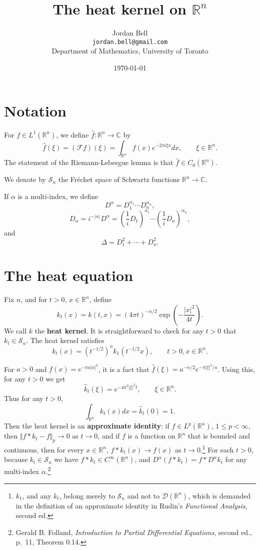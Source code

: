 \documentclass{article}
\newcommand{\norm}[1]{\Vert #1 \Vert}
\begin{document}
\title{The heat kernel on $\mathbb{R}^n$}
\author{Jordan Bell\\ \texttt{jordan.bell@gmail.com}\\Department of Mathematics, University of Toronto}
\date{\today}


\maketitle

\section{Notation}
For $f \in L^1(\mathbb{R}^n)$, we define $\hat{f}:\mathbb{R}^n \to \mathbb{C}$ by 
\[
\hat{f}(\xi) =(\mathscr{F}f)(\xi)= \int_{\mathbb{R}^n} f(x) e^{-2\pi i \xi x} dx, \qquad \xi \in \mathbb{R}^n.
\]
The statement of the Riemann-Lebesgue lemma is that $\hat{f} \in C_0(\mathbb{R}^n)$. 

We denote by $\mathscr{S}_n$ the Fr\'echet space of Schwartz functions $\mathbb{R}^n \to \mathbb{C}$.

If $\alpha$ is a multi-index, we define
\[
D^\alpha = D_1^{\alpha_1} \cdots D_n^{\alpha_n},
\]
\[
D_\alpha = i^{-|\alpha|} D^\alpha = \left(\frac{1}{i} D_1\right)^{\alpha_1} \cdots \left( \frac{1}{i} D_n\right)^{\alpha_n},
\]
and
\[
\Delta = D_1^2 + \cdots + D_n^2.
\]


\section{The heat equation}
Fix $n$, 
and for $t>0$, $x \in \mathbb{R}^n$, define
\[
k_t(x) =k(t,x)= (4\pi t)^{-n/2} \exp\left(-\frac{|x|^2}{4t}\right).
\]
We call $k$ the \textbf{heat kernel}.
It is straightforward to check for any $t>0$ that $k_t \in \mathscr{S}_n$.
The heat kernel satisfies
\[
k_t(x)=(t^{-1/2})^n k_1(t^{-1/2}x), \qquad t>0, x\in \mathbb{R}^n.
\]

For $a>0$ and $f(x)=e^{-\pi a|x|^2}$, it is a fact that $\hat{f}(\xi)=a^{-n/2} e^{-\pi |\xi|^2/a}$. Using this, for any $t>0$ we
get
\[
\hat{k}_t(\xi)=e^{-4\pi^2 |\xi|^2 t}, \qquad \xi \in \mathbb{R}^n.
\]
Thus for any $t>0$,
\[
\int_{\mathbb{R}^n} k_t(x) dx = \hat{k}_t(0)=1.
\]
Then the heat kernel is an \textbf{approximate identity}: if $f \in L^p(\mathbb{R}^n)$, $1 \leq p < \infty$, then 
$\norm{f*k_t - f}_p \to 0$ as $t \to 0$, and if $f$ is a function on $\mathbb{R}^n$ that is bounded and continuous, then for every
$x \in \mathbb{R}^n$, $f*k_t(x) \to f(x)$ as $t \to 0$.\footnote{$k_1$, and any $k_t$, belong merely to $\mathscr{S}_n$ and not to
$\mathscr{D}(\mathbb{R}^n)$, which is demanded in the definition of an approximate identity in Rudin's {\em Functional Analysis},
second ed.} For each $t>0$, because $k_t \in \mathscr{S}_n$ we have $f* k_t \in C^\infty(\mathbb{R}^n)$,
and $D^\alpha(f*k_t)=f*D^\alpha k_t$ for any multi-index $\alpha$.\footnote{Gerald B. Folland, {\em Introduction to Partial Differential Equations}, second ed.,
p.~11, Theorem 0.14.}
\end{document}
